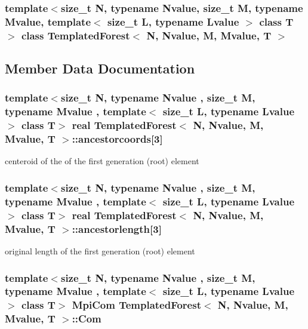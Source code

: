 \subsubsection*{template$<$size\_\-t N, typename Nvalue, size\_\-t M, typename Mvalue, template$<$ size\_\-t L, typename Lvalue $>$ class T$>$ class TemplatedForest$<$ N, Nvalue, M, Mvalue, T $>$}



\subsection{Member Data Documentation}
\hypertarget{classTemplatedForest_a33e679903d44367ba048d401694b3eb5}{
\subsubsection[{ancestorcoords}]{\setlength{\rightskip}{0pt plus 5cm}template$<$size\_\-t N, typename Nvalue , size\_\-t M, typename Mvalue , template$<$ size\_\-t L, typename Lvalue $>$ class T$>$ real {\bf TemplatedForest}$<$ N, Nvalue, M, Mvalue, T $>$::{\bf ancestorcoords}\mbox{[}3\mbox{]}}}
\label{classTemplatedForest_a33e679903d44367ba048d401694b3eb5}
centeroid of the of the first generation (root) element \hypertarget{classTemplatedForest_a06f7d7d964f553fa04b7ec98022b1434}{
\subsubsection[{ancestorlength}]{\setlength{\rightskip}{0pt plus 5cm}template$<$size\_\-t N, typename Nvalue , size\_\-t M, typename Mvalue , template$<$ size\_\-t L, typename Lvalue $>$ class T$>$ real {\bf TemplatedForest}$<$ N, Nvalue, M, Mvalue, T $>$::{\bf ancestorlength}\mbox{[}3\mbox{]}}}
\label{classTemplatedForest_a06f7d7d964f553fa04b7ec98022b1434}
original length of the first generation (root) element \hypertarget{classTemplatedForest_ae035f47727cbf2b23e423c48b6dea3db}{
\subsubsection[{Com}]{\setlength{\rightskip}{0pt plus 5cm}template$<$size\_\-t N, typename Nvalue , size\_\-t M, typename Mvalue , template$<$ size\_\-t L, typename Lvalue $>$ class T$>$ {\bf MpiCom} {\bf TemplatedForest}$<$ N, Nvalue, M, Mvalue, T $>$::{\bf Com}}}

